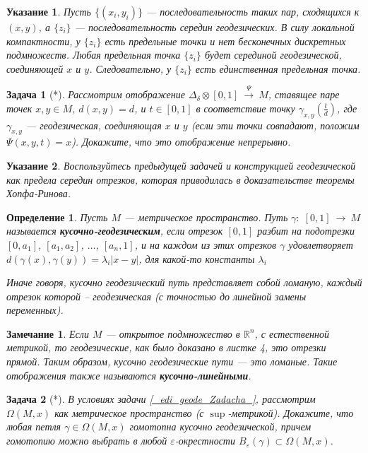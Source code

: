 \documentclass[12pt]{book}
\newcommand{\arrow}{{\:\longrightarrow\:}}
\renewcommand{\epsilon}{\varepsilon}
\def\R{{\mathbb R}}
\theoremstyle{upshape}
\newtheorem{zadacha}{Задача}[chapter]
\theoremstyle{generic}
\newtheorem{opredelenie}[teorema]{Определение}
\theoremstyle{upshapenonumber}
\newtheorem{ukazanie}{Указание}[section]
\newtheorem{zamechanie}{Замечание}[chapter]
\newcommand{\следствие}{%
     \refstepcounter{teorema}
     {\noindent\bf Следствие \thechapter.\arabic{teorema}:\ }}
\newcommand{\пример}{%
     \refstepcounter{teorema}
     {\noindent\bf Пример \thechapter.\arabic{teorema}:\ }}
\newcommand{\лемма}{%
     \refstepcounter{teorema}
     {\noindent\bf Лемма \thechapter.\arabic{teorema}:\ }}
\newcommand{\теорема}{%
     \refstepcounter{teorema}
     {\noindent\bf Теорема \thechapter.\arabic{teorema}:\ }}
\newcommand{\утверждение}{%
     \refstepcounter{teorema}
     {\noindent\bf Утверждение \thechapter.\arabic{teorema}:\ }}
\begin{document}
{\begin{ukazanie}
Пусть $\{(x_i, y_i)\}$ --- последовательность таких
пар, сходящихся к $(x,y)$, а 
$\{z_i\}$ --- последовательность середин геодезических.
В силу локальной компактности, у $\{z_i\}$
есть предельные точки и нет бесконечных 
дискретных подмножеств. Любая предельная точка 
$\{z_i\}$ будет серединой геодезической,
соединяющей $x$ и $y$. Следовательно, у 
$\{z_i\}$ есть единственная предельная точка.
\end{ukazanie}

\begin{zadacha}[*]
Рассмотрим отображение 
$\Delta_\delta\otimes [0,1] \stackrel \Psi \arrow M$, 
ставящее паре точек $x, y\in M$, $d(x,y)=d$, 
и $t\in [0,1]$ в соответствие точку
$\gamma_{x,y}\left(\frac t d\right)$,
где $\gamma_{x,y}$ --- геодезическая,
соединяющая $x$ и $y$ (если эти точки 
совпадают, положим $\Psi(x,y,t)=x$).
Докажите, что это отображение непрерывно.
\end{zadacha}

\begin{ukazanie}
Воспользуйтесь предыдущей задачей и конструкцией
геодезической как предела середин отрезков,
которая приводилась в доказательстве
теоремы Хопфа-Ринова.
\end{ukazanie}

\begin{opredelenie}
Пусть $M$ --- метрическое пространство.
Путь $\gamma:\; [0,1] \arrow M$ 
называется {\bf кусочно-геодезическим},
если отрезок $[0,1]$ разбит на подотрезки
$[0, a_1]$, $[a_1, a_2]$, $\ldots$, $[a_n, 1]$,
и на каждом из этих отрезков $\gamma$
удовлетворяет $d (\gamma(x), \gamma(y)) = \lambda_i|x-y|$,
для какой-то константы $\lambda_i$

Иначе говоря, кусочно геодезический путь представляет
собой ломаную, каждый отрезок которой --
геодезическая (с точностью до линейной замены переменных).
\end{opredelenie}

\begin{zamechanie}
Если $M$ --- открытое подмножество в $\R^n$,
с естественной метрикой, то геодезические,
как было доказано в листке 4, это отрезки прямой.
Таким образом, кусочно геодезические
пути --- это ломаные. Такие отображения также
называются {\bf кусочно-линейными}.
\end{zamechanie}

\begin{zadacha}[*]
В условиях задачи \ref{_edi_geode_Zadacha_},
рассмотрим $\Omega(M,x)$ как метрическое
пространство (с $\sup$-метрикой). 
Докажите, что любая петля $\gamma\in\Omega(M,x)$
гомотопна кусочно геодезической, причем 
гомотопию можно выбрать в любой $\epsilon$-окрестности
$B_\epsilon(\gamma)\subset \Omega(M,x)$.
\end{zadacha}

}
\end{document}
